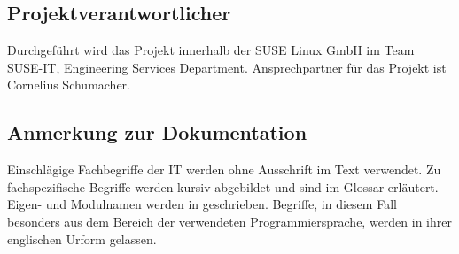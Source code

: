 %
%
%
%
%
%
%

\subsection{Projektverantwortlicher}
\label{sec:Projektverantwortlicher}
Durchgeführt wird das Projekt innerhalb der SUSE Linux GmbH im Team SUSE-IT, Engineering Services
Department. Ansprechpartner für das Projekt ist Cornelius Schumacher.

\subsection{Anmerkung zur Dokumentation}
\label{sec:Anmerkung zur Dokumentation}
Einschlägige Fachbegriffe der IT werden ohne Ausschrift im Text verwendet. Zu fachspezifische
Begriffe werden kursiv abgebildet und sind im Glossar erläutert. Eigen- und Modulnamen werden in
\anf{ } geschrieben. Begriffe, in diesem Fall besonders aus dem Bereich der verwendeten Programmiersprache,
werden in ihrer englischen Urform gelassen.
\pagebreak
